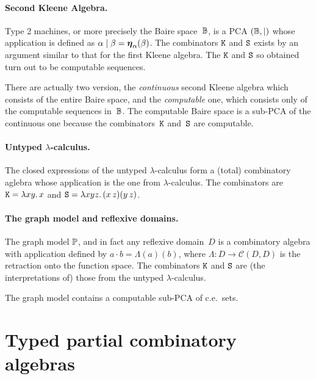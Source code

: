 \paragraph{Second Kleene Algebra.}

Type 2 machines, or more precisely the Baire space~$\mathbb{B}$, is a PCA
$(\mathbb{B}, {\mid})$ whose application is defined as $\alpha \mid \beta
= \text{\boldmath{$\eta$}}_{\alpha}(\beta)$. The combinators $\mathtt{K}$ and $\mathtt{S}$ exists
by an argument similar to that for the first Kleene algebra. The
$\mathtt{K}$ and $\mathtt{S}$ so obtained turn out to be computable sequences.

There are actually two version, the \emph{continuous} second Kleene
algebra which consists of the entire Baire space, and the
\emph{computable} one, which consists only of the computable sequences
in~$\mathbb{B}$. The computable Baire space is a sub-PCA of the continuous
one because the combinators~$\mathtt{K}$ and~$\mathtt{S}$ are computable.

\paragraph{Untyped $\lambda$-calculus.}

The closed expressions of the untyped $\lambda$-calculus form a
(total) combinatory aglebra whose application is the one from
$\lambda$-calculus. The combinators are $\mathtt{K} = \lambda x y .\,x$ and
$\mathtt{S} = \lambda x y z .\,(x \, z)(y \, z)$.

\paragraph{The graph model and reflexive domains.}

The graph model $\mathbb{P}$, and in fact any reflexive domain~$D$ is a
combinatory algebra with application defined by $a \cdot b =
\Lambda(a)(b)$, where $\Lambda : D \to \mathcal{C}(D, D)$ is the
retraction onto the function space. The combinators $\mathtt{K}$ and
$\mathtt{S}$ are (the interpretations of) those from the untyped
$\lambda$-calculus.

The graph model contains a computable sub-PCA of c.e.~sets.



\section{Typed partial combinatory algebras}
\label{sec:tpcas}

